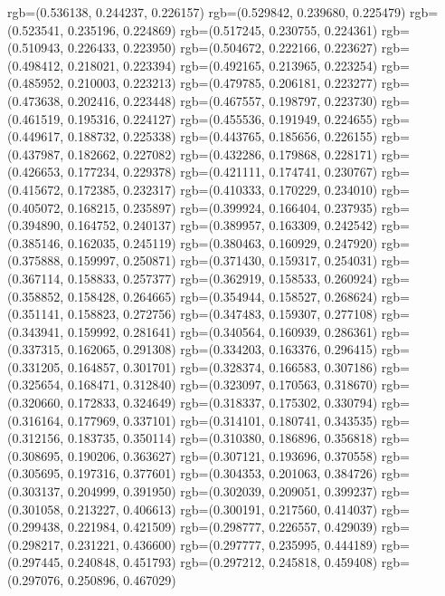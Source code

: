 {{{					rgb=(0.536138, 0.244237, 0.226157)
					rgb=(0.529842, 0.239680, 0.225479)
					rgb=(0.523541, 0.235196, 0.224869)
					rgb=(0.517245, 0.230755, 0.224361)
					rgb=(0.510943, 0.226433, 0.223950)
					rgb=(0.504672, 0.222166, 0.223627)
					rgb=(0.498412, 0.218021, 0.223394)
					rgb=(0.492165, 0.213965, 0.223254)
					rgb=(0.485952, 0.210003, 0.223213)
					rgb=(0.479785, 0.206181, 0.223277)
					rgb=(0.473638, 0.202416, 0.223448)
					rgb=(0.467557, 0.198797, 0.223730)
					rgb=(0.461519, 0.195316, 0.224127)
					rgb=(0.455536, 0.191949, 0.224655)
					rgb=(0.449617, 0.188732, 0.225338)
					rgb=(0.443765, 0.185656, 0.226155)
					rgb=(0.437987, 0.182662, 0.227082)
					rgb=(0.432286, 0.179868, 0.228171)
					rgb=(0.426653, 0.177234, 0.229378)
					rgb=(0.421111, 0.174741, 0.230767)
					rgb=(0.415672, 0.172385, 0.232317)
					rgb=(0.410333, 0.170229, 0.234010)
					rgb=(0.405072, 0.168215, 0.235897)
					rgb=(0.399924, 0.166404, 0.237935)
					rgb=(0.394890, 0.164752, 0.240137)
					rgb=(0.389957, 0.163309, 0.242542)
					rgb=(0.385146, 0.162035, 0.245119)
					rgb=(0.380463, 0.160929, 0.247920)
					rgb=(0.375888, 0.159997, 0.250871)
					rgb=(0.371430, 0.159317, 0.254031)
					rgb=(0.367114, 0.158833, 0.257377)
					rgb=(0.362919, 0.158533, 0.260924)
					rgb=(0.358852, 0.158428, 0.264665)
					rgb=(0.354944, 0.158527, 0.268624)
					rgb=(0.351141, 0.158823, 0.272756)
					rgb=(0.347483, 0.159307, 0.277108)
					rgb=(0.343941, 0.159992, 0.281641)
					rgb=(0.340564, 0.160939, 0.286361)
					rgb=(0.337315, 0.162065, 0.291308)
					rgb=(0.334203, 0.163376, 0.296415)
					rgb=(0.331205, 0.164857, 0.301701)
					rgb=(0.328374, 0.166583, 0.307186)
					rgb=(0.325654, 0.168471, 0.312840)
					rgb=(0.323097, 0.170563, 0.318670)
					rgb=(0.320660, 0.172833, 0.324649)
					rgb=(0.318337, 0.175302, 0.330794)
					rgb=(0.316164, 0.177969, 0.337101)
					rgb=(0.314101, 0.180741, 0.343535)
					rgb=(0.312156, 0.183735, 0.350114)
					rgb=(0.310380, 0.186896, 0.356818)
					rgb=(0.308695, 0.190206, 0.363627)
					rgb=(0.307121, 0.193696, 0.370558)
					rgb=(0.305695, 0.197316, 0.377601)
					rgb=(0.304353, 0.201063, 0.384726)
					rgb=(0.303137, 0.204999, 0.391950)
					rgb=(0.302039, 0.209051, 0.399237)
					rgb=(0.301058, 0.213227, 0.406613)
					rgb=(0.300191, 0.217560, 0.414037)
					rgb=(0.299438, 0.221984, 0.421509)
					rgb=(0.298777, 0.226557, 0.429039)
					rgb=(0.298217, 0.231221, 0.436600)
					rgb=(0.297777, 0.235995, 0.444189)
					rgb=(0.297445, 0.240848, 0.451793)
					rgb=(0.297212, 0.245818, 0.459408)
					rgb=(0.297076, 0.250896, 0.467029)
}}}
